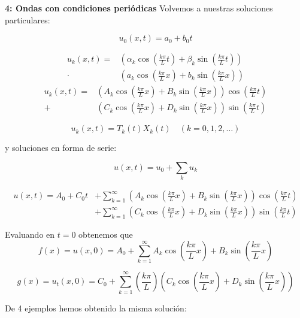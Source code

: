 \begin{example}{\bf 4: Ondas con condiciones periódicas}
			Volvemos a nuestras soluciones particulares:

			\[u_0(x,t) = a_0 + b_0t\]


			\begin{align*}
			u_k(x,t) = &\left(\alpha_k \cos \left( \frac{k \pi}{L} t \right) + \beta_k \sin \left( \frac{k \pi}{L} t \right) \right) \\
			\cdot &\left(a_k \cos \left( \frac{k \pi}{L} x \right) + b_k \sin \left( \frac{k \pi}{L} x \right) \right)
			\end{align*}
			\begin{align*}
			u_k(x,t) = &\left(A_k \cos \left( \frac{k \pi}{L} x \right) + B_k \sin \left( \frac{k \pi}{L} x \right) \right) \cos \left( \frac{k \pi}{L} t \right)\\
			+ &\left(C_k \cos \left( \frac{k \pi}{L} x \right) + D_k \sin \left( \frac{k \pi}{L} x \right) \right) \sin \left( \frac{k \pi}{L} t \right)
			\end{align*}




			\[u_k(x,t) = T_k(t) X_k(t) \quad (k=0,1,2,…)\]


			y soluciones en forma de serie:

			\[ u(x,t) = u_0 + \sum_k u_k \]

			\begin{align*}
				u(x,t) = A_0 + C_0 t &+ \sum^{\infty}_{k=1} \left(A_k \cos \left( \frac{k \pi}{L} x \right) + B_k \sin \left( \frac{k \pi}{L} x \right) \right) \cos \left( \frac{k \pi}{L} t \right)\\
				&+ \sum^{\infty}_{k=1} \left(C_k \cos \left( \frac{k \pi}{L} x \right) + D_k \sin \left( \frac{k \pi}{L} x \right) \right) \sin \left( \frac{k \pi}{L} t \right)
			\end{align*}

			Evaluando en $t = 0$ obtenemos que
			\[f(x) = u(x,0) = A_0 + \sum_{k=1}^{\infty} A_k \cos \left( \frac{k \pi}{L} x \right) + B_k \sin \left( \frac{k \pi}{L} x \right) \]

			\[g(x) = u_t (x,0) = C_0 + \sum_{k=1}^{\infty} \left(\frac{k \pi}{L}\right) \left( C_k \cos \left( \frac{k \pi}{L} x \right) + D_k \sin \left( \frac{k \pi}{L} x \right)\right) \]


		\end{example}

		De 4 ejemplos hemos obtenido la misma solución:

